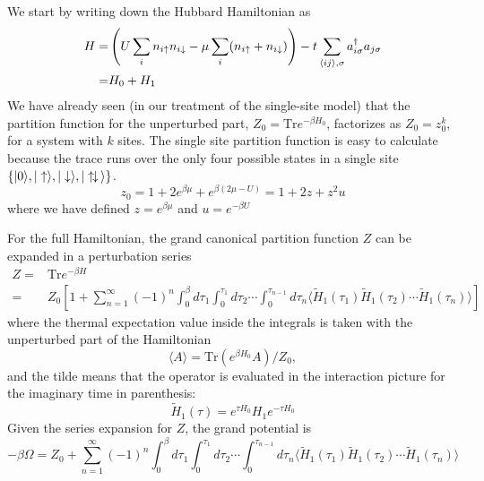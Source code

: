 We start by writing down the Hubbard Hamiltonian as  
\begin{equation}
\begin{split}
  H = &  
         \left( U\sum_{i} n_{i \uparrow } n_{i \downarrow}  
         - \mu\sum_{i}( n_{i \uparrow } + n_{i \downarrow} ) \right)
-t \sum_{ \langle ij \rangle, \sigma   } 
          a_{i\sigma}^{\dagger}a_{j\sigma} \\
   = &  H_{0} + H_{1} 
\end{split}
\end{equation}
We have already seen (in our treatment of the single-site model) that the
partition function for the unperturbed part, $Z_{0} = \text{Tr} e^{-\beta
H_{0}}$, factorizes as $Z_{0} = z_{0}^{k}$, for a system with $k$ sites.  The
single site partition function  is easy to calculate because the trace runs
over the only four possible states in a single site $\lbrace |0\rangle,
| \uparrow \rangle, | \downarrow\rangle, | \uparrow\! \downarrow \, \rangle\rbrace$.
\begin{equation}
 z_{0} = 1 + 2 e^{\beta\mu} + e^{\beta (2\mu-U)} = 1 + 2z + z^{2}u 
\end{equation}
where we have defined $z=e^{\beta\mu}$ and $u=e^{-\beta U }$ 



For the full Hamiltonian, the grand canonical partition function $Z$ can be
expanded in a perturbation series~\cite{mahan2000many,Henderson1992} 
\begin{equation}
\begin{split}
  Z = & \text{Tr} e^{-\beta H}  \\
    = & Z_{0} \left[ 1 + 
        \sum_{n=1}^{\infty} (-1)^{n} 
        \int_{0}^{\beta} d\tau_{1} \int_{0}^{\tau_{1}} d\tau_{2} 
        \dotsm \int_{0}^{\tau_{n-1}} d\tau_{n} 
        \langle
              \tilde{H}_{1}(\tau_{1}) 
              \tilde{H}_{1}(\tau_{2})  \dotsm
              \tilde{H}_{1}(\tau_{n})  \rangle 
              \right] 
\end{split}
\end{equation} 
where the thermal expectation value inside the integrals is taken with the
unperturbed part of the Hamiltonian
\begin{equation}
\langle A \rangle = \text{Tr} ( e^{\beta H_{0} } A ) / Z_{0} , 
\end{equation}
and the tilde means that the operator is evaluated in the interaction picture
for the imaginary time in parenthesis: 
\begin{equation}
 \tilde{H}_{1}(\tau) = e^{\tau H_{0}} H_{1} e^{-\tau H_{0}} 
\end{equation}
Given the series expansion for $Z$, the grand potential is 
\begin{equation}
 -\beta \Omega = Z_{0} + 
        \sum_{n=1}^{\infty} (-1)^{n} 
        \int_{0}^{\beta} d\tau_{1} \int_{0}^{\tau_{1}} d\tau_{2} 
        \dotsm \int_{0}^{\tau_{n-1}} d\tau_{n} 
        \langle
              \tilde{H}_{1}(\tau_{1}) 
              \tilde{H}_{1}(\tau_{2})  \dotsm
              \tilde{H}_{1}(\tau_{n})  \rangle 
\end{equation}

